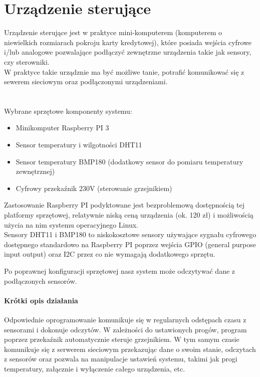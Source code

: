 \documentclass[a4paper,10pt]{article}
\begin{document}
\section{Urządzenie sterujące}
\label{urzadzenie_sterujace}

Urządzenie sterujące jest w praktyce mini-komputerem (komputerem o niewielkich rozmiarach pokroju karty kredytowej), które posiada wejścia cyfrowe i/lub analogowe pozwalające podłączyć zewnętrzne urządzenia takie jak sensory, czy sterowniki.\\
W praktyce takie urządznie ma być możliwe tanie, potrafić komunikować się z sewerem sieciowym oraz podłączonymi urządzeniami. \\\\\\

Wybrane sprzętowe komponenty systemu:
\begin{itemize}
    \item Minikomputer Raspberry PI 3 \cite{RpiWiki}
    \item Sensor temperatury i wilgotności DHT11 
    \item Sensor temperatury BMP180 (dodatkowy sensor do pomiaru temperatury zewnętrznej)
    \item Cyfrowy przekaźnik 230V (sterowanie grzejnikiem)
\end{itemize}

Zastosowanie Raspberry PI podyktowane jest bezproblemową dostępnością tej platformy sprzętowej, relatywnie niską ceną urządzenia (ok. 120 zł) i możliwością użycia na nim systemu operacyjnego Linux.\\

Sensory DHT11 i BMP180 to niskokosztowe sensory używające sygnału cyfrowego dostępnego standardowo na Raspberry PI poprzez wejścia GPIO (general purpose input output) oraz I2C\cite{I2CWiki} przez co nie wymagają dodatkowego sprzętu. 

Po poprawnej konfiguracji sprzętowej nasz system może odczytywać dane z podłączonych sensorów. 

\paragraph{Krótki opis działania} 
Odpowiednie  oprogramowanie komunikuje się w regularnych odstępach czasu z sensorami i dokonuje odczytów. W zależności do ustawionych progów, program poprzez przekaźnik automatycznie steruje grzejnikiem. W tym samym czasie komunikuje się z serwerem sieciowym przekazując dane o swoim stanie, odczytach z sensorów oraz pozwala na manipulacje ustawień systemu, takimi jak progi temperatury, załącznie i wyłączenie całego urządzenia, etc.
\end{document}
